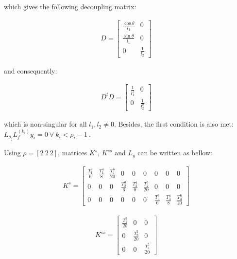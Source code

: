 \documentclass[letterpaper, 10 pt, conference]{ieeeconf}  %
\begin{document}
which gives the following decoupling matrix:

\begin{eqnarray}
D = 
\left[\begin{array}{cc}
\frac{\cos\theta}{l_1} & 0\\
\frac{\sin\theta}{l_1} & 0\\
0 & \frac{1}{l_2}
\end{array}\right]
\end{eqnarray}

and consequently:

\begin{eqnarray}
D^tD = 
\left[\begin{array}{cc}
\frac{1}{l_1^2} & 0\\
0 & \frac{1}{l_2^2}
\end{array}\right]
\end{eqnarray}

which is non-singular for all $l_1, l_2 \neq 0$. Besides, the first condition is also met: $L_{g_j}L^{(k_i)}_fy_i = 0\ \forall\ k_i < \rho_i-1\ $.

Using $\rho = [2\ 2\ 2]$, matrices $K^{s}$, $K^{ss}$ and $L_y$ can be written as bellow:

\begin{eqnarray}
K^s =
\left[\begin{array}{ccccccccc}
\frac{T_1^3}{6} & \frac{T_1^4}{8} & \frac{T_1^5}{20} & 0 & 0 & 0 & 0 & 0 & 0\\
0 & 0 & 0 & \frac{T_2^3}{6} & \frac{T_2^4}{8} & \frac{T_2^5}{20} & 0 & 0 & 0\\
0 & 0 & 0 & 0 & 0 & 0 & \frac{T_3^3}{6} & \frac{T_3^4}{8} & \frac{T_3^5}{20}
\end{array}\right]
\end{eqnarray}

\begin{eqnarray}
K^{ss} =
\left[\begin{array}{ccc}
\frac{T_1^5}{20} & 0 & 0\\
0 & \frac{T_2^5}{20} & 0\\
0 & 0 & \frac{T_3^5}{20}
\end{array}\right]
\end{eqnarray}

\end{document}

